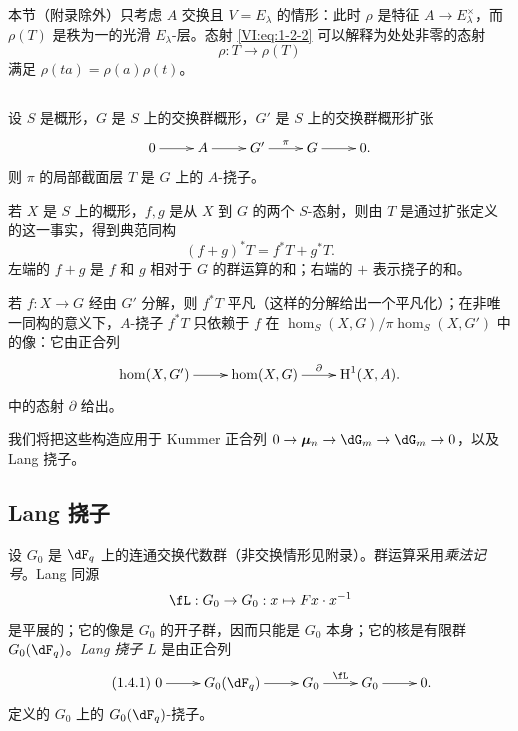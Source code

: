 本节（附录除外）只考虑 $A$ 交换且 $V=E_\lambda$ 的情形：此时 $\rho$ 是特征 $A\to E_\lambda^\times$，而 $\rho(T)$ 是秩为一的光滑 $E_\lambda$-层。态射 \eqref{VI:eq:1-2-2} 可以解释为处处非零的态射
\begin{equation*}\tag{1.2.3}\label{VI:eq:1-2-3}
  \rho:T\to \rho(T)
\end{equation*}
满足 $\rho(t a) = \rho(a)\rho(t)$。

\subsection{}\label{VI:1-3}

设 $S$ 是概形，$G$ 是 $S$ 上的交换群概形，$G'$ 是 $S$ 上的交换群概形扩张
\[\xymatrix{
  0 \ar[r]
    & A \ar[r]
    & G' \ar[r]^-\pi
    & G \ar[r]
    & 0 \text{.}
}\]
则 $\pi$ 的局部截面层 $T$ 是 $G$ 上的 $A$-挠子。

若 $X$ 是 $S$ 上的概形，$f,g$ 是从 $X$ 到 $G$ 的两个 $S$-态射，则由 $T$ 是通过扩张定义的这一事实，得到典范同构
\begin{equation*}\tag{1.3.1}\label{VI:eq:1-3-1}
  (f+g)^\ast T = f^\ast T + g^\ast T \text{.}
\end{equation*}
左端的 $f+g$ 是 $f$ 和 $g$ 相对于 $G$ 的群运算的和；右端的 $+$ 表示挠子的和。

若 $f:X\to G$ 经由 $G'$ 分解，则 $f^\ast T$ 平凡（这样的分解给出一个平凡化）；在非唯一同构的意义下，$A$-挠子 $f^\ast T$ 只依赖于 $f$ 在 $\hom_S(X,G)/\pi\hom_S(X,G')$ 中的像：它由正合列
\[\xymatrix{
  \hom(X,G') \ar[r]
    & \hom(X,G) \ar[r]^-\partial
    & \h^1(X,A) \text{.}
}\]
中的态射 $\partial$ 给出。

我们将把这些构造应用于 Kummer 正合列 $0 \to \dmu_n \to \dG_m \to \dG_m \to 0$，以及 Lang 挠子。

\subsection{Lang 挠子}\label{VI:1-4}

设 $G_0$ 是 $\dF_q$ 上的连通交换代数群（非交换情形见附录）。群运算采用\emph{乘法记号}。Lang 同源
\[
\fL:G_0 \to G_0: x\mapsto F x\cdot x^{-1}
\]
是平展的；它的像是 $G_0$ 的开子群，因而只能是 $G_0$ 本身；它的核是有限群 $G_0(\dF_q)$。\emph{Lang 挠子} $L$ 是由正合列
\begin{equation*}\tag{1.4.1}\label{VI:eq:1-4-1}
\xymatrix{
  0 \ar[r]
    & G_0(\dF_q) \ar[r]
    & G_0 \ar[r]^-\fL
    & G_0 \ar[r]
    & 0 \text{.}
}
\end{equation*}
定义的 $G_0$ 上的 $G_0(\dF_q)$-挠子。

